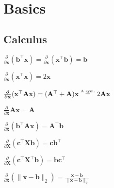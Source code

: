\section{Basics}
\subsection*{Calculus}
\begin{inparaitem}[$\color{mygreen} \triangleright$]
	\item $\frac{\partial}{\partial \mathbf{x}}(\mathbf{b}^\top \mathbf{x}) = \frac{\partial}{\partial \mathbf{x}}(\mathbf{x}^\top \mathbf{b}) = \mathbf{b}$ \quad
	\item $\frac{\partial}{\partial \mathbf{x}}(\mathbf{x}^\top \mathbf{x}) = 2\mathbf{x}$ \\
	\item $\frac{\partial}{\partial \mathbf{x}}(\mathbf{x}^\top \mathbf{A}\mathbf{x}) = (\mathbf{A}^\top + \mathbf{A})\mathbf{x} \stackrel{\text{\tiny A sym.}}{=} 2\mathbf{A}\mathbf{x}$
	\item $\frac{\partial}{\partial \mathbf{x}}\mathbf{A}\mathbf{x}=\mathbf{A}$\\
	\item $\frac{\partial}{\partial \mathbf{x}}(\mathbf{b}^\top \mathbf{A}\mathbf{x}) = \mathbf{A}^\top \mathbf{b}$ \quad
	\item $\frac{\partial}{\partial \mathbf{X}}(\mathbf{c}^\top \mathbf{X} \mathbf{b}) = \mathbf{c}\mathbf{b}^\top$ \\
	\item $\frac{\partial}{\partial \mathbf{X}}(\mathbf{c}^\top \mathbf{X}^\top \mathbf{b}) = \mathbf{b}\mathbf{c}^\top$ \quad
	\item $\frac{\partial}{\partial \mathbf{x}}(\| \mathbf{x}-\mathbf{b} \|_2) = \frac{\mathbf{x}-\mathbf{b}}{\|\mathbf{x}-\mathbf{b}\|_2}$ \\

\end{inparaitem}
